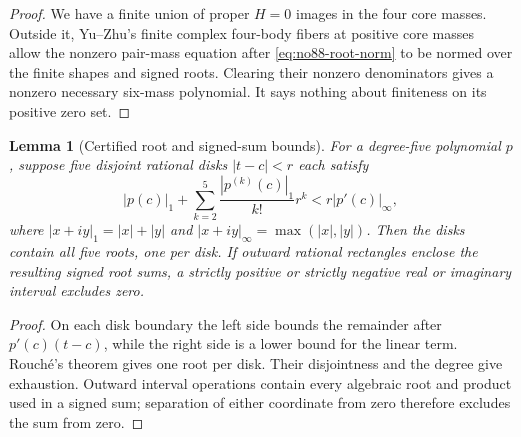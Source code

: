 \documentclass[11pt]{amsart}
\newtheorem{lemma}[theorem]{Lemma}
\theoremstyle{remark}
\begin{document}
\begin{proof}
We have a finite union of proper $H=0$ images in the four core masses. Outside it, Yu--Zhu's finite complex four-body fibers at positive core masses~\cite{YZ} allow the nonzero pair-mass equation after \eqref{eq:no88-root-norm} to be normed over the finite shapes and signed roots. Clearing their nonzero denominators gives a nonzero necessary six-mass polynomial. It says nothing about finiteness on its positive zero set.
\end{proof}

\begin{lemma} [Certified root and signed-sum bounds]
\label{lem:root-interval-bounds}
For a degree-five polynomial $p$, suppose five disjoint
rational disks $|t-c|<r$ each satisfy
\[
|p(c)|_1+\sum_{k=2}^{5}\frac{|p^{(k)}(c)|_1}{k!}r^k
<r|p'(c)|_\infty,
\]
where $|x+iy|_1=|x|+|y|$ and
$|x+iy|_\infty=\max(|x|,|y|)$. Then the disks
contain all five roots, one per disk. If outward
rational rectangles enclose the resulting signed
root sums, a strictly positive or strictly negative
real or imaginary interval excludes zero.
\end{lemma}
\begin{proof}
On each disk boundary the left side bounds the
remainder after $p'(c)(t-c)$, while the right side
is a lower bound for the linear term. Rouch\'e's
theorem gives one root per disk. Their disjointness
and the degree give exhaustion. Outward interval
operations contain every algebraic root and product
used in a signed sum; separation of either coordinate
from zero therefore excludes the sum from zero.
\end{proof}
\end{document}
